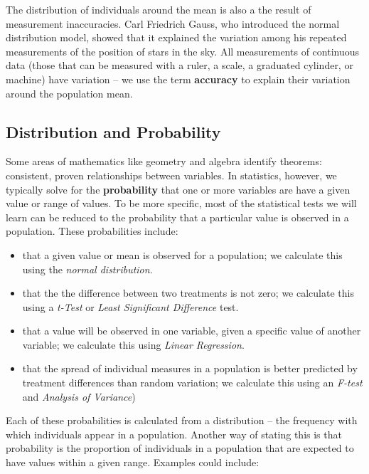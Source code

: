 \documentclass[
]{book}
\begin{document}
The distribution of individuals around the mean is also a the result of measurement inaccuracies. Carl Friedrich Gauss, who introduced the normal distribution model, showed that it explained the variation among his repeated measurements of the position of stars in the sky. All measurements of continuous data (those that can be measured with a ruler, a scale, a graduated cylinder, or machine) have variation -- we use the term \textbf{accuracy} to explain their variation around the population mean.

\hypertarget{distribution-and-probability}{%
\subsection{Distribution and Probability}\label{distribution-and-probability}}

Some areas of mathematics like geometry and algebra identify theorems: consistent, proven relationships between variables. In statistics, however, we typically solve for the \textbf{probability} that one or more variables are have a given value or range of values. To be more specific, most of the statistical tests we will learn can be reduced to the probability that a particular value is observed in a population. These probabilities include:

\begin{itemize}
\item
  that a given value or mean is observed for a population; we calculate this using the \emph{normal distribution}.
\item
  that the the difference between two treatments is not zero; we calculate this using a \emph{t-Test} or \emph{Least Significant Difference} test.
\item
  that a value will be observed in one variable, given a specific value of another variable; we calculate this using \emph{Linear Regression}.
\item
  that the spread of individual measures in a population is better predicted by treatment differences than random variation; we calculate this using an \emph{F-test} and \emph{Analysis of Variance})
\end{itemize}

Each of these probabilities is calculated from a distribution -- the frequency with which individuals appear in a population. Another way of stating this is that probability is the proportion of individuals in a population that are expected to have values within a given range. Examples could include:
\end{document}
